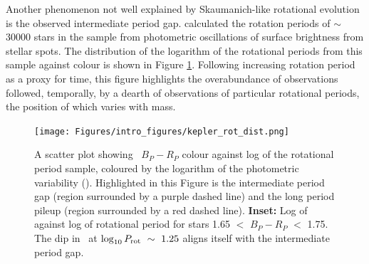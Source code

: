 Another phenomenon not well explained by Skaumanich-like rotational evolution is the observed intermediate period gap.
\citet{mcquillan_rotation_2014} calculated the rotation periods of $\sim$30000 stars in the \kepler{} sample from photometric oscillations of surface brightness from stellar spots.
The distribution of the logarithm of the rotational periods from this sample against colour is shown in Figure \ref{fig:kepler_rot_period}. 
Following increasing rotation period as a proxy for time, this figure highlights the overabundance of observations followed, temporally, by a dearth of observations of particular rotational periods, the position of which varies with mass.

\begin{figure}[h]
    \texttt{[image: Figures/intro\_figures/kepler\_rot\_dist.png]}
    \caption[The rotational period distribution of the \citet{mcquillan_rotation_2014} sample highlighting the intermediate period gap and long period pileup.]{A scatter plot showing \GDRT \ $B_P-R_P$ colour against log of the \kepler{} \citet{mcquillan_rotation_2014} rotational period sample, coloured by the logarithm of the photometric variability (\rper). Highlighted in this Figure is the intermediate period gap (region surrounded by a purple dashed line) and the long period pileup (region surrounded by a red dashed line). \textbf{Inset:} Log of \rper{} against log of rotational period for stars 1.65 $<$ $B_P - R_P$ $<$ 1.75.  The dip in \rper\ at $\log_{10} P_{\rm{rot}} \ \sim\ 1.25$ aligns itself with the intermediate period gap.
    }
    \label{fig:kepler_rot_period}
\end{figure}

